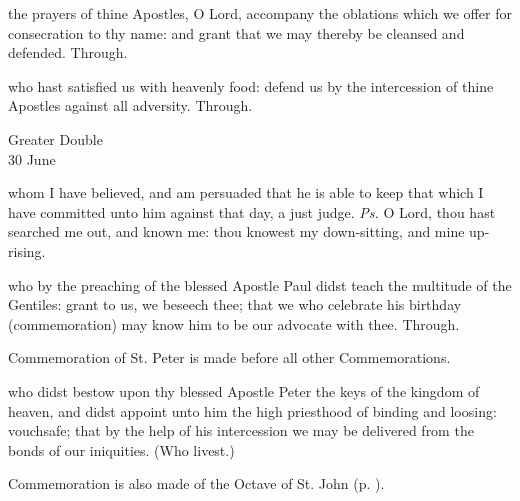 
\secret
{} the prayers of thine Apostles, O Lord, accompany the oblations which we offer for consecration to thy name: and grant that we may thereby be cleansed and defended. Through.


\postcommunion
{} who hast satisfied us with heavenly food: defend us by the intercession of thine Apostles against all adversity. Through.


\begin{inhead}
    {Greater Double\\
30 June}
\end{inhead}

\introit
{} whom I have believed, and am persuaded that he is able to keep that which I have committed unto him against that day, a just judge. \textit{Ps.} O Lord, thou hast searched me out, and known me: thou knowest my down-sitting, and mine up-rising.

\collect
{} who by the preaching of the blessed Apostle Paul didst teach the multitude of the Gentiles: grant to us, we beseech thee; that we who celebrate his birthday (commemoration) may know him to be our advocate with thee. Through.

\begin{rubric}
	Commemoration of St. Peter is made before all other Commemorations.
\end{rubric}

 who didst bestow upon thy blessed Apostle Peter the keys of the kingdom of heaven, and didst  appoint unto him the high priesthood of binding and loosing: vouchsafe; that by the help of his intercession we may be delivered from the bonds of our iniquities. (Who livest.)
\begin{rubric}
	Commemoration is also made of the Octave of St. John (p. \pageref{JohnCollect}).
\end{rubric}


